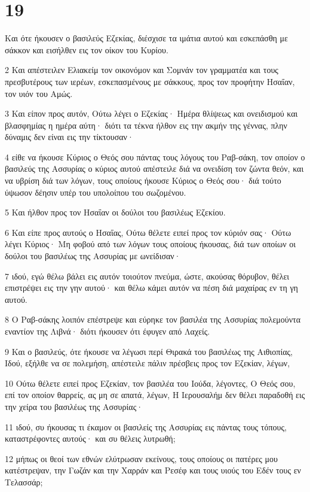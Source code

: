 \chapter{19}

\par Και ότε ήκουσεν ο βασιλεύς Εζεκίας, διέσχισε τα ιμάτια αυτού και εσκεπάσθη με σάκκον και εισήλθεν εις τον οίκον του Κυρίου.
\par 2 Και απέστειλεν Ελιακείμ τον οικονόμον και Σομνάν τον γραμματέα και τους πρεσβυτέρους των ιερέων, εσκεπασμένους με σάκκους, προς τον προφήτην Ησαΐαν, τον υιόν του Αμώς.
\par 3 Και είπον προς αυτόν, Ούτω λέγει ο Εζεκίας· Ημέρα θλίψεως και ονειδισμού και βλασφημίας η ημέρα αύτη· διότι τα τέκνα ήλθον εις την ακμήν της γέννας, πλην δύναμις δεν είναι εις την τίκτουσαν·
\par 4 είθε να ήκουσε Κύριος ο Θεός σου πάντας τους λόγους του Ραβ-σάκη, τον οποίον ο βασιλεύς της Ασσυρίας ο κύριος αυτού απέστειλε διά να ονειδίση τον ζώντα θεόν, και να υβρίση διά των λόγων, τους οποίους ήκουσε Κύριος ο Θεός σου· διά τούτο ύψωσον δέησιν υπέρ του υπολοίπου του σωζομένου.
\par 5 Και ήλθον προς τον Ησαΐαν οι δούλοι του βασιλέως Εζεκίου.
\par 6 Και είπε προς αυτούς ο Ησαΐας, Ούτω θέλετε ειπεί προς τον κύριόν σας· Ούτω λέγει Κύριος· Μη φοβού από των λόγων τους οποίους ήκουσας, διά των οποίων οι δούλοι του βασιλέως της Ασσυρίας με ωνείδισαν·
\par 7 ιδού, εγώ θέλω βάλει εις αυτόν τοιούτον πνεύμα, ώστε, ακούσας θόρυβον, θέλει επιστρέψει εις την γην αυτού· και θέλω κάμει αυτόν να πέση διά μαχαίρας εν τη γη αυτού.
\par 8 Ο Ραβ-σάκης λοιπόν επέστρεψε και εύρηκε τον βασιλέα της Ασσυρίας πολεμούντα εναντίον της Λιβνά· διότι ήκουσεν ότι έφυγεν από Λαχείς.
\par 9 Και ο βασιλεύς, ότε ήκουσε να λέγωσι περί Θιρακά του βασιλέως της Αιθιοπίας, Ιδού, εξήλθε να σε πολεμήση, απέστειλε πάλιν πρέσβεις προς τον Εζεκίαν, λέγων,
\par 10 Ούτω θέλετε ειπεί προς Εζεκίαν, τον βασιλέα του Ιούδα, λέγοντες, Ο Θεός σου, επί τον οποίον θαρρείς, ας μη σε απατά, λέγων, Η Ιερουσαλήμ δεν θέλει παραδοθή εις την χείρα του βασιλέως της Ασσυρίας·
\par 11 ιδού, συ ήκουσας τι έκαμον οι βασιλείς της Ασσυρίας εις πάντας τους τόπους, καταστρέφοντες αυτούς· και συ θέλεις λυτρωθή;
\par 12 μήπως οι θεοί των εθνών ελύτρωσαν εκείνους, τους οποίους οι πατέρες μου κατέστρεψαν, την Γωζάν και την Χαρράν και Ρεσέφ και τους υιούς του Εδέν τους εν Τελασσάρ;
